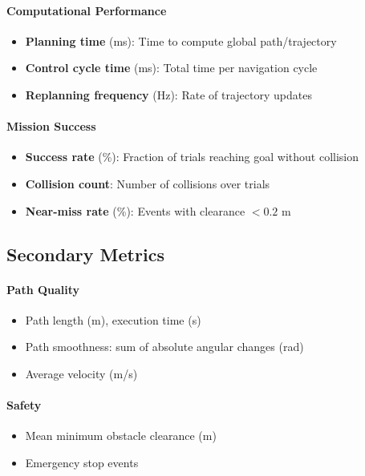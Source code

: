 \paragraph{Computational Performance}
\begin{itemize}
    \item \textbf{Planning time} (ms): Time to compute global path/trajectory
    \item \textbf{Control cycle time} (ms): Total time per navigation cycle
    \item \textbf{Replanning frequency} (Hz): Rate of trajectory updates
\end{itemize}

\paragraph{Mission Success}
\begin{itemize}
    \item \textbf{Success rate} (\%): Fraction of trials reaching goal without collision
    \item \textbf{Collision count}: Number of collisions over trials
    \item \textbf{Near-miss rate} (\%): Events with clearance $< 0.2$ m
\end{itemize}

\subsection{Secondary Metrics}

\paragraph{Path Quality}
\begin{itemize}
    \item Path length (m), execution time (s)
    \item Path smoothness: sum of absolute angular changes (rad)
    \item Average velocity (m/s)
\end{itemize}

\paragraph{Safety}
\begin{itemize}
    \item Mean minimum obstacle clearance (m)
    \item Emergency stop events
\end{itemize}

